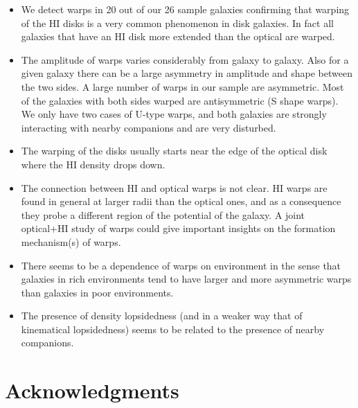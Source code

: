 \documentclass{aa}
\begin{document}
\begin{itemize}

\item

We detect warps in 20 out of our 26 sample galaxies confirming that 
warping of the HI disks is a very common phenomenon in disk
galaxies. In fact all galaxies that have an HI disk more extended
than the optical are warped.

\item

The amplitude of warps varies considerably from galaxy to galaxy. Also
for a given galaxy there can be a large asymmetry in amplitude and shape
between the two sides. A large number of warps in our sample are
asymmetric. 
Most of the galaxies with both sides warped are antisymmetric (S
shape warps). We only have two cases of U-type warps, and both
galaxies are strongly interacting with nearby companions and are very
disturbed. 

\item

The warping of the disks usually starts near the edge of the optical
disk where the HI density drops down.

\item

The connection between HI and optical warps is not clear.
HI warps are found in general at larger radii than the
optical ones, and as a consequence they probe a different region of
the potential of the galaxy. A joint optical+HI study of warps could
give important insights on the formation mechanism(s) of warps.

\item

There seems to be a dependence of warps on environment in the sense that galaxies in
rich environments tend to have larger and more asymmetric warps than
galaxies in poor environments. 

\item

The presence of density lopsidedness (and in a weaker way that of
ki\-ne\-matical lopsidedness) seems to be related to the presence of
nearby companions. 

\end{itemize}

\section*{Acknowledgments}
\end{document}
